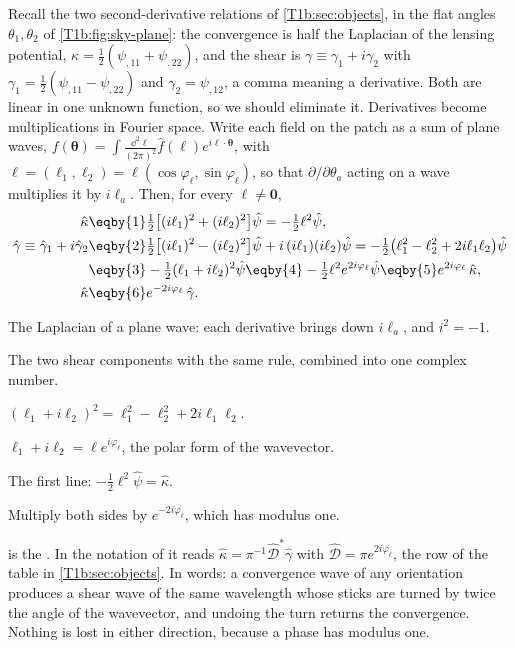 Recall the two second-derivative relations of \cref{T1b:sec:objects}, in the flat angles $\theta_1,\theta_2$ of
\cref{T1b:fig:sky-plane}: the convergence is half the Laplacian of the lensing potential, $\kappa=\frac12(\psi_{,11}
+\psi_{,22})$, and the shear is $\gamma\equiv\gamma_1+i\gamma_2$ with $\gamma_1=\frac12(\psi_{,11}-\psi_{,22})$ and
$\gamma_2=\psi_{,12}$, a comma meaning a derivative. Both are linear in one unknown function, so we should eliminate
it. Derivatives become multiplications in Fourier space. Write each field on the patch as a sum of plane waves,
$f(\bm\theta)=\int\frac{\dd^2\ell}{(2\pi)^2}\hat f(\bm\ell)e^{i\bm\ell\cdot\bm\theta}$, with
$\bm\ell=(\ell_1,\ell_2)=\ell(\cos\varphi_\ell,\sin\varphi_\ell)$, so that $\partial/\partial\theta_a$ acting on a
wave multiplies it by $i\ell_a$. Then, for every $\bm\ell\neq\bm0$,
\begin{align}
\hat\kappa
&\eqby{1}\tfrac12\bigl[(i\ell_1)^2+(i\ell_2)^2\bigr]\hat\psi=-\tfrac12\ell^2\hat\psi,
\nonumber\\
\hat\gamma\equiv\hat\gamma_1+i\hat\gamma_2
&\eqby{2}\tfrac12\bigl[(i\ell_1)^2-(i\ell_2)^2\bigr]\hat\psi+i\,(i\ell_1)(i\ell_2)\hat\psi
=-\tfrac12\bigl(\ell_1^2-\ell_2^2+2i\ell_1\ell_2\bigr)\hat\psi
\nonumber\\
&\eqby{3}-\tfrac12(\ell_1+i\ell_2)^2\hat\psi
\eqby{4}-\tfrac12\ell^2e^{2i\varphi_\ell}\hat\psi
\eqby{5}e^{2i\varphi_\ell}\,\hat\kappa ,
\label{12w:eq:ks-forward}\\
\hat\kappa&\eqby{6}e^{-2i\varphi_\ell}\,\hat\gamma .
\label{12w:eq:ks}
\end{align}
\begin{explain}
  \item The Laplacian of a plane wave: each derivative brings down $i\ell_a$, and $i^2=-1$.
  \item The two shear components with the same rule, combined into one complex number.
  \item $(\ell_1+i\ell_2)^2=\ell_1^2-\ell_2^2+2i\ell_1\ell_2$.
  \item $\ell_1+i\ell_2=\ell e^{i\varphi_\ell}$, the polar form of the wavevector.
  \item The first line: $-\frac12\ell^2\hat\psi=\hat\kappa$.
  \item Multiply both sides by $e^{-2i\varphi_\ell}$, which has modulus one.
\end{explain}
 is the  \cite{KaiserSquires1993}. In the notation of
 it reads $\hat\kappa=\pi^{-1}\hat{\mathcal D}^*\hat\gamma$ with
$\hat{\mathcal D}=\pi e^{2i\varphi_\ell}$, the row of the table in \cref{T1b:sec:objects}. In words: a convergence
wave of any orientation produces a shear wave of the same wavelength whose sticks are turned by twice the angle of
the wavevector, and undoing the turn returns the convergence. Nothing is lost in either direction, because a
phase has modulus one.

